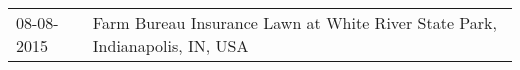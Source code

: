 \begin{supertabular}{ll}
 08-08-2015 &  Farm Bureau Insurance Lawn at White River State Park, Indianapolis, IN, USA \\
\end{supertabular}
